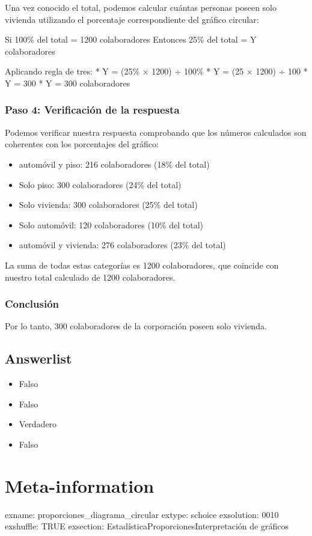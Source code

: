 \documentclass[
]{article}
\providecommand{\tightlist}{%
  \setlength{\itemsep}{0pt}\setlength{\parskip}{0pt}}
\begin{document}
Una vez conocido el total, podemos calcular cuántas personas poseen solo
vivienda utilizando el porcentaje correspondiente del gráfico circular:

Si 100\% del total = 1200 colaboradores Entonces 25\% del total = Y
colaboradores

Aplicando regla de tres: * Y = (25\% × 1200) ÷ 100\% * Y = (25 × 1200) ÷
100 * Y = 300 * Y = 300 colaboradores

\subsubsection{Paso 4: Verificación de la
respuesta}\label{paso-4-verificaciuxf3n-de-la-respuesta}

Podemos verificar nuestra respuesta comprobando que los números
calculados son coherentes con los porcentajes del gráfico:

\begin{itemize}
\tightlist
\item
  automóvil y piso: 216 colaboradores (18\% del total)
\item
  Solo piso: 300 colaboradores (24\% del total)
\item
  Solo vivienda: 300 colaboradores (25\% del total)
\item
  Solo automóvil: 120 colaboradores (10\% del total)
\item
  automóvil y vivienda: 276 colaboradores (23\% del total)
\end{itemize}

La suma de todas estas categorías es 1200 colaboradores, que coincide
con nuestro total calculado de 1200 colaboradores.

\subsubsection{Conclusión}\label{conclusiuxf3n}

Por lo tanto, 300 colaboradores de la corporación poseen solo vivienda.

\subsection{Answerlist}\label{answerlist-1}

\begin{itemize}
\tightlist
\item
  Falso
\item
  Falso
\item
  Verdadero
\item
  Falso
\end{itemize}

\section{Meta-information}\label{meta-information}

exname: proporciones\_diagrama\_circular extype: schoice exsolution:
0010 exshuffle: TRUE exsection:
Estadística\textbar Proporciones\textbar Interpretación de gráficos
\end{document}
